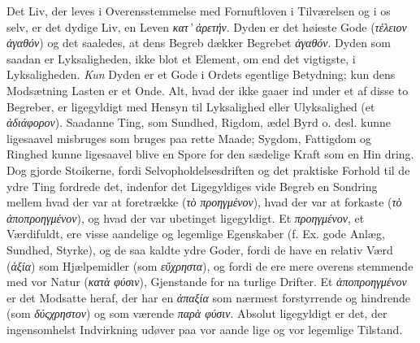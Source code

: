 \documentclass[12pt,a4paper]{book}
\newcommand{\gk}[1]{\textit{#1}}
\begin{document}
Det Liv, der leves i Overensstemmelse med Fornuftloven
i Tilværelsen og i os selv, er det dydige Liv, en Leven \gk{κατ'
ἀρετήν}. Dyden er det høieste Gode (\gk{τέλειον ἀγαθόν}) og det
saaledes, at dens Begreb dækker Begrebet \gk{ἀγαθόν}. Dyden
som saadan er Lyksaligheden, ikke blot et Element, om end
det vigtigste, i Lyksaligheden. \emph{Kun} Dyden er et Gode i
Ordets egentlige Betydning; kun dens Modsætning Lasten er
et Onde. Alt, hvad der ikke gaaer ind under et af disse to
Begreber, er ligegyldigt med Hensyn til Lyksalighed eller
Ulyksalighed (et \gk{ἀδιάφορον}). Saadanne Ting, som Sundhed,
Rigdom, ædel Byrd o. desl. kunne ligesaavel misbruges som
bruges paa rette Maade; Sygdom, Fattigdom og Ringhed kunne
ligesaavel blive en Spore for den sædelige Kraft som en Hin\-%
dring. Dog gjorde Stoikerne, fordi Selvopholdelsesdriften og
det praktiske Forhold til de ydre Ting fordrede det, indenfor
det Ligegyldiges vide Begreb en Sondring mellem hvad der
var at foretrække (\gk{τὸ προηγμένον}), hvad der var at forkaste
(\gk{τὸ ἀποπροηγμένον}), og hvad der var ubetinget ligegyldigt.
Et \gk{προηγμένον}, et Værdifuldt, ere visse aandelige og legemlige
Egenskaber (f. Ex. gode Anlæg, Sundhed, Styrke), og de saa\-%
kaldte ydre Goder, fordi de have en relativ Værd (\gk{ἀξία}) som
Hjælpemidler (som \gk{εὔχρηστα}), og fordi de ere mere overens\-%
stemmende med vor Natur (\gk{κατὰ φύσιν}), Gjenstande for na\-%
turlige Drifter. Et \gk{ἀποπροηγμένον} er det Modsatte heraf, der
har en \gk{ἀπαξία} som nærmest forstyrrende og hindrende (som
\gk{δύςχρηστον}) og som værende \gk{παρὰ φύσιν}. Absolut ligegyldigt
er det, der ingensomhelst Indvirkning udøver paa vor aande\-%
lige og vor legemlige Tilstand.
\end{document}

